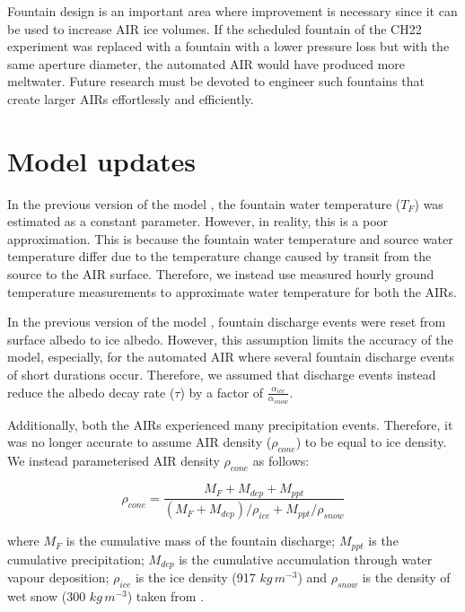 \documentclass[tc, manuscript]{copernicus}
\begin{document}
Fountain design is an important area where improvement is necessary since it can be used to increase AIR ice
volumes. If the scheduled fountain of the CH22 experiment was replaced with a fountain with a lower pressure
loss but with the same aperture diameter, the automated AIR would have produced more meltwater. Future research
must be devoted to engineer such fountains that create larger AIRs effortlessly and efficiently.

\appendix


\section{Model updates} \label{sec:Mod_updates}

In the previous version of the model \citep{balasubramanianInfluenceMeteorologicalConditions2022}, the fountain
water temperature ($T_F$) was estimated as a constant parameter. However, in reality, this is a poor
approximation. This is because the fountain water temperature and source water temperature differ due to the
temperature change caused by transit from the source to the  AIR surface. Therefore, we instead use measured
hourly ground temperature measurements to approximate water temperature for both the AIRs.

In the previous version of the model \citep{balasubramanianInfluenceMeteorologicalConditions2022}, fountain
discharge events were reset from surface albedo to ice albedo. However, this assumption limits the accuracy of
the model, especially, for the automated AIR where several fountain discharge events of short durations occur.
Therefore, we assumed that discharge events instead reduce the albedo decay rate ($\tau$) by a 
factor of $\frac{\alpha_{ice}}{\alpha_{snow}}$.

Additionally, both the AIRs experienced many precipitation events. Therefore, it was no longer accurate to
assume AIR density ($\rho_{cone}$) to be equal to ice density. We instead parameterised AIR density $\rho_{cone}$ as follows:

\begin{equation}
  \rho_{cone} = \frac{M_{F} + M_{dep} + M_{ppt}}{(M_{F} + M_{dep})/\rho_{ice} + M_{ppt}/\rho_{snow}}
\end{equation}

where $M_F$ is the cumulative mass of the fountain discharge; $M_{ppt}$ is the cumulative precipitation;
$M_{dep}$ is the cumulative accumulation through water vapour deposition; $\rho_{ice}$ is the ice density (917
$kg\,m^{-3}$) and $\rho_{snow}$ is the density of wet snow (300 $kg\,m^{-3}$) taken from
\cite{cuffeyPhysicsGlaciers2010} .
\end{document}

